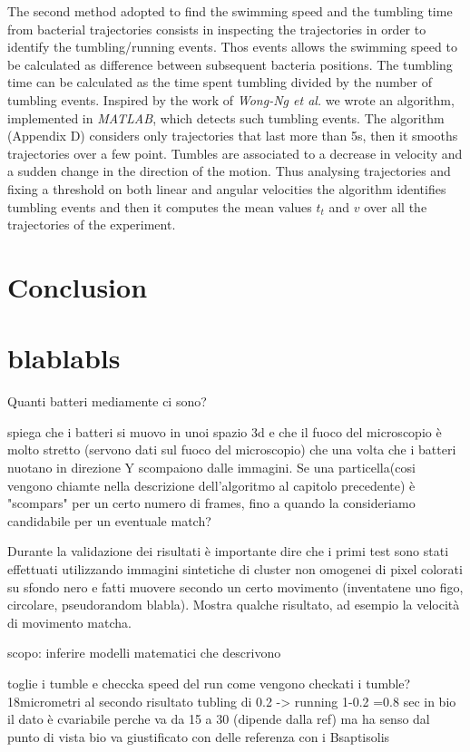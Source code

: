 \documentclass[conference]{IEEEtran}
\begin{document}
The second method adopted to find the swimming speed and the tumbling time from bacterial trajectories consists in inspecting the trajectories in order to identify the tumbling/running events. Thos events allows the swimming speed to be calculated as difference between subsequent bacteria positions. The tumbling time can be calculated as the time spent tumbling divided by the number of tumbling events. Inspired by the work of \textit{Wong-Ng et al.} we wrote an algorithm, implemented in \textit{MATLAB}, which detects such tumbling events. The algorithm (Appendix D) considers only trajectories that last more than 5s, then it smooths trajectories over a few point. 
Tumbles are associated to a decrease in velocity and a sudden change in the direction of the motion. Thus analysing trajectories and fixing a threshold on both linear and angular velocities the algorithm identifies tumbling events and then it computes the mean values $t_t$ and $v$ over all the trajectories of the experiment. 


\section{Conclusion}
\section{blablabls}
Quanti batteri mediamente ci sono? 


spiega che i batteri si muovo in unoi spazio 3d e che il fuoco del microscopio è molto stretto (servono dati sul fuoco del microscopio)  che una volta che i batteri nuotano in direzione Y scompaiono dalle immagini. 
Se una particella(cosi vengono chiamte nella descrizione dell'algoritmo al capitolo precedente) è "scompars" per un certo numero di frames, fino a quando la consideriamo candidabile per un eventuale match?

Durante la validazione dei risultati è importante dire che i primi test sono stati effettuati utilizzando immagini  sintetiche di cluster non omogenei di pixel colorati su sfondo nero e fatti muovere secondo un certo movimento  (inventatene uno figo, circolare, pseudorandom blabla). 
Mostra qualche risultato, ad esempio la velocità di movimento matcha. 

scopo: inferire modelli matematici che descrivono 

toglie i tumble e checcka speed del run
come vengono checkati i tumble?
18micrometri al secondo risultato
tubling di 0.2 -> running 1-0.2 =0.8 sec
in bio il dato è cvariabile perche va da 15 a 30 (dipende dalla ref) ma ha senso dal punto di vista bio
va giustificato con delle referenza con i Bsaptisolis
\end{document}
